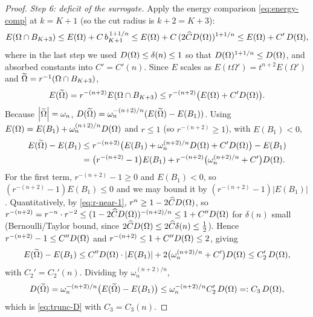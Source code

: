 \begin{proof}
\smallskip
\emph{Step 6: deficit of the surrogate.}
Apply the energy comparison \eqref{eq:energy-comp} at $k=K+1$ (so the
cut radius is $k+2=K+3$):
\[
   E(\Omega\cap B_{K+3})\le E(\Omega)+C\,b_{K+1}^{\,1+1/n}
   \le E(\Omega)+C\,(2\widehat C D(\Omega))^{1+1/n}
   \le E(\Omega)+C'\,D(\Omega),
\]
where in the last step we used $D(\Omega)\le\delta(n)\le1$ so that
$D(\Omega)^{1+1/n}\le D(\Omega)$, and absorbed constants into
$C'=C'(n)$. Since $E$ scales as
$E(t\Omega')=t^{n+2}E(\Omega')$ and $\widetilde{\Omega}=r^{-1}(\Omega\cap B_{K+3})$,
\[
   E(\widetilde{\Omega})=r^{-(n+2)}E(\Omega\cap B_{K+3})
   \le r^{-(n+2)}\bigl(E(\Omega)+C'D(\Omega)\bigr).
\]
Because $\left|\widetilde{\Omega}\right|=\omega_n$,
$D(\widetilde{\Omega})=\omega_n^{-(n+2)/n}(E(\widetilde{\Omega})-E(B_1))$. Using
$E(\Omega)=E(B_1)+\omega_n^{(n+2)/n}D(\Omega)$ and $r\le1$ (so
$r^{-(n+2)}\ge1$), with $E(B_1)<0$,
\begin{align*}
   E(\widetilde{\Omega})-E(B_1)
   &\le r^{-(n+2)}\bigl(E(B_1)+\omega_n^{(n+2)/n}D(\Omega)+C'D(\Omega)\bigr)-E(B_1)\\
   &=\bigl(r^{-(n+2)}-1\bigr)E(B_1)
     +r^{-(n+2)}\bigl(\omega_n^{(n+2)/n}+C'\bigr)D(\Omega).
\end{align*}
For the first term, $r^{-(n+2)}-1\ge0$ and $E(B_1)<0$, so
$(r^{-(n+2)}-1)E(B_1)\le0$ and we may bound it by
$(r^{-(n+2)}-1)|E(B_1)|$. Quantitatively, by \eqref{eq:r-near-1},
$r^{n}\ge1-2\widehat C D(\Omega)$, so
$r^{-(n+2)}=r^{-n}\cdot r^{-2}\le(1-2\widehat C D(\Omega))^{-(n+2)/n}
\le1+C''D(\Omega)$ for $\delta(n)$ small (Bernoulli/Taylor bound, since
$2\widehat C D(\Omega)\le2\widehat C\delta(n)\le\tfrac12$). Hence
$r^{-(n+2)}-1\le C''D(\Omega)$ and $r^{-(n+2)}\le1+C''D(\Omega)\le2$, giving
\[
   E(\widetilde{\Omega})-E(B_1)
   \le C''D(\Omega)\cdot\left|E(B_1)\right|+2\bigl(\omega_n^{(n+2)/n}+C'\bigr)D(\Omega)
   \le C_2'\,D(\Omega),
\]
with $C_2'=C_2'(n)$. Dividing by $\omega_n^{(n+2)/n}$,
\begin{equation}\label{eq:D-tilde}
   D(\widetilde{\Omega})=\omega_n^{-(n+2)/n}\bigl(E(\widetilde{\Omega})-E(B_1)\bigr)
   \le\omega_n^{-(n+2)/n}C_2'\,D(\Omega)=:C_3\,D(\Omega),
\end{equation}
which is \eqref{eq:trunc-D} with $C_3=C_3(n)$.


\end{proof}

